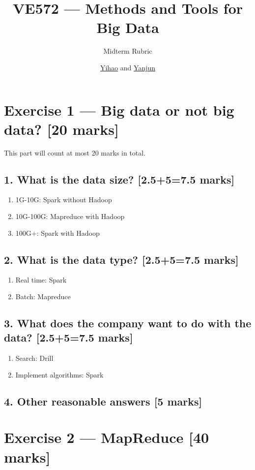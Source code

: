 \documentclass[11pt,a4paper]{article}
\title{VE572 --- Methods and Tools for Big Data}
\subtitle{Midterm Rubric}
\author{\href{mailto:liuyh615@sjtu.edu.cn}{Yihao} and \href{mailto:AuroraZYJ@sjtu.edu.cn}{Yanjun}}
\begin{document}
\maketitle

\section*{Exercise 1 --- Big data or not big data? [20 marks]}

This part will count at most 20 marks in total.

\subsection*{1. What is the data size? [2.5+5=7.5 marks]}

\begin{enumerate}
	\item 1G-10G: Spark without Hadoop
	\item 10G-100G: Mapreduce with Hadoop
	\item 100G+: Spark with Hadoop
\end{enumerate}

\subsection*{2. What is the data type? [2.5+5=7.5 marks]}

\begin{enumerate}
	\item Real time: Spark
	\item Batch: Mapreduce
\end{enumerate}

\subsection*{3. What does the company want to do with the data? [2.5+5=7.5 marks]}

\begin{enumerate}
	\item Search: Drill
	\item Implement algorithms: Spark
\end{enumerate}

\subsection*{4. Other reasonable answers [5 marks]}

\section*{Exercise 2 --- MapReduce [40 marks]}
\end{document}
